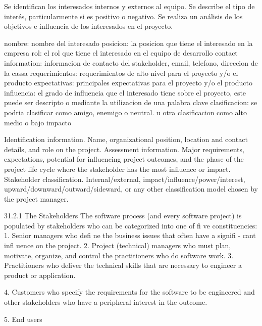 Se identifican los interesados internos y
externos al equipo. Se describe el tipo de
interés, particularmente si es positivo o
negativo. Se realiza un análisis de los objetivos
e influencia de los interesados en el proyecto.


nombre: nombre del interesado
posicion: la posicion que tiene el interesado en la empresa
rol: el rol que tiene el interesado en el equipo de desarrollo
contact information: informacion de contacto del stakeholder, email, telefono, direccion de la cassa
requerimientos: requerimientos de alto nivel para el proyecto y/o el producto
expectativas: principales expectativas para el proyecto y/o el producto
influencia: el grado de influencia que el interesado tiene sobre el proyecto, este puede ser descripto o mediante la utilizacion de una palabra clave
clasificacion: se podria clasificar como amigo, enemigo o neutral. u otra clasificacion como alto medio o bajo impacto


Identification information. Name, organizational position, location and
contact details, and role on the project.
Assessment information. Major requirements, expectations, potential for
influencing project outcomes, and the phase of the project life cycle where the
stakeholder has the most influence or impact.
Stakeholder classification. Internal/external, impact/influence/power/interest,
upward/downward/outward/sideward, or any other classification model chosen
by the project manager.

31.2.1 The Stakeholders
The software process (and every software project) is populated by stakeholders
who can be categorized into one of fi ve constituencies:
1. Senior managers who defi ne the business issues that often have a signifi -
cant infl uence on the project.
2. Project (technical) managers who must plan, motivate, organize, and control
the practitioners who do software work.
3. Practitioners who deliver the technical skills that are necessary to engineer
a product or application.


4. Customers who specify the requirements for the software to be engineered
and other stakeholders who have a peripheral interest in the
outcome.



5. End users

\newpage

\begin{table}[]
\end{table}